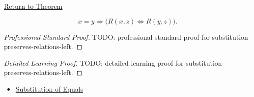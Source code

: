 \newpage
{}
\label{prf:substitution-preserves-relations-left}

\begin{remark*}[Return]
\hyperref[prop:substitution-preserves-relations-left]{Return to Theorem}
\end{remark*}

\begin{proposition*}
\[
x=y \Longrightarrow \bigl(R(x,z)\Longleftrightarrow R(y,z)\bigr).
\]
\end{proposition*}

\begin{proof}[Professional Standard Proof]
\LRAProofBodyStart
TODO: professional standard proof for substitution-preserves-relations-left.
\end{proof}

\begin{proof}[Detailed Learning Proof]
\LRAProofBodyStart
TODO: detailed learning proof for substitution-preserves-relations-left.
\end{proof}

\begin{remark*}
\end{remark*}

\begin{dependencies}
\begin{itemize}
  \item \hyperref[ax:equality-substitution]{Substitution of Equals}
\end{itemize}
\end{dependencies}

\clearpage
